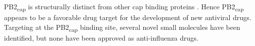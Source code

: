 PB2\textsubscript{cap} is structurally distinct from other cap binding proteins \citep{1192}. Hence PB2\textsubscript{cap} appears to be a favorable drug target for the development of new antiviral drugs. Targeting at the PB2\textsubscript{cap} binding site, several novel small molecules \citep{1236,1557,1558} have been identified, but none have been approved as anti-influenza drugs.



